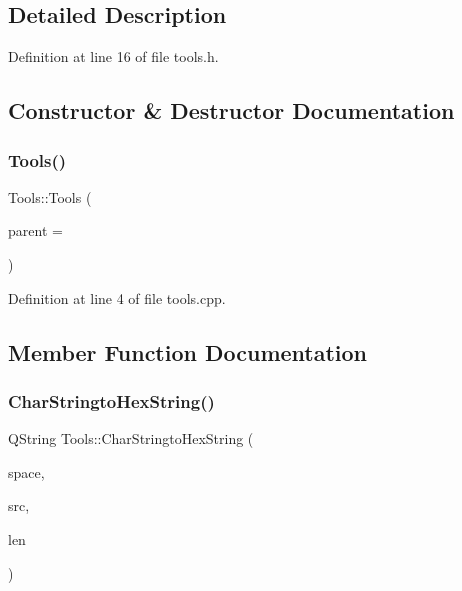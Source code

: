 \subsection{Detailed Description}


Definition at line 16 of file tools.\+h.



\subsection{Constructor \& Destructor Documentation}
\mbox{\label{class_tools_a812eaff6fdce0fe489279f72c06e83e3}} 
\subsubsection{\texorpdfstring{Tools()}{Tools()}}
{\footnotesize\ttfamily Tools\+::\+Tools (\begin{DoxyParamCaption}\item[{Q\+Object $\ast$}]{parent = {} }\end{DoxyParamCaption})\hspace{0.3cm}{\ttfamily [explicit]}}



Definition at line 4 of file tools.\+cpp.



\subsection{Member Function Documentation}
\mbox{\label{class_tools_a89da3511a27330d893d495ddc6160a91}} 
\subsubsection{\texorpdfstring{CharStringtoHexString()}{CharStringtoHexString()}\hspace{0.1cm}{\footnotesize\ttfamily [1/2]}}
{\footnotesize\ttfamily Q\+String Tools\+::\+Char\+Stringto\+Hex\+String (\begin{DoxyParamCaption}\item[{Q\+String}]{space,  }\item[{const char $\ast$}]{src,  }\item[{int}]{len }\end{DoxyParamCaption})}



